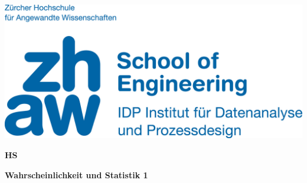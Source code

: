 \noindent
\begin{minipage}[t]{0.4\textwidth} 
\includegraphics[width=\linewidth]{logo.jpg}
\end{minipage}%
\hfill%
\begin{minipage}[t]{0.4\textwidth}\raggedleft
\textbf{\large HS \the\year}
\end{minipage}

\begin{center}
 \textbf{\large Wahrscheinlichkeit und Statistik 1} \\
 \vspace{0.3cm}
\end{center}
